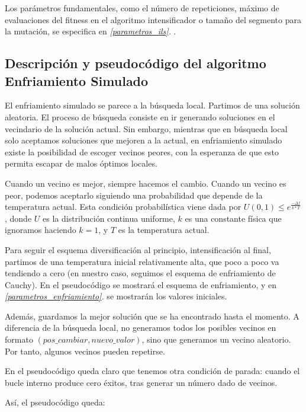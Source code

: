 \documentclass[11pt]{article}
\begin{document}
Los parámetros fundamentales, como el número de repeticiones, máximo de evaluaciones del fitness en el algoritmo intensificador o tamaño del segmento para la mutación, se especifica en \emph{\ref{parametros_ils}. }.

\pagebreak

\subsection{Descripción y pseudocódigo del algoritmo Enfriamiento Simulado}

El enfriamiento simulado se parece a la búsqueda local. Partimos de una solución aleatoria. El proceso de búsqueda consiste en ir generando soluciones en el vecindario de la solución actual. Sin embargo, mientras que en búsqueda local solo aceptamos soluciones que mejoren a la actual, en enfriamiento simulado existe la posibilidad de escoger vecinos peores, con la esperanza de que esto permita escapar de malos óptimos locales.

Cuando un vecino es mejor, siempre hacemos el cambio. Cuando un vecino es peor, podemos aceptarlo siguiendo una probabilidad que depende de la temperatura actual. Esta condición probabilística viene dada por $U(0, 1) \leq e^{\frac{-\Delta f}{k * T}}$, donde $U$ es la distribución continua uniforme, $k$ es una constante física que ignoramos haciendo $k = 1$, y $T$ es la temperatura actual.

Para seguir el esquema diversificación al principio, intensificación al final, partimos de una temperatura inicial relativamente alta, que poco a poco va tendiendo a cero (en nuestro caso, seguimos el esquema de enfriamiento de Cauchy). En el pseudocódigo se mostrará el esquema de enfriamiento, y en \emph{\ref{parametros_enfriamiento}. } se mostrarán los valores iniciales.

Además, guardamos la mejor solución que se ha encontrado hasta el momento. A diferencia de la búsqueda local, no generamos todos los posibles vecinos en formato $(pos\_cambiar, nuevo\_valor)$, sino que generamos un vecino aleatorio. Por tanto, algunos vecinos pueden repetirse.

En el pseudocódigo queda claro que tenemos otra condición de parada: cuando el bucle interno produce cero éxitos, tras generar un número dado de vecinos.

Así, el pseudocódigo queda:
\end{document}
